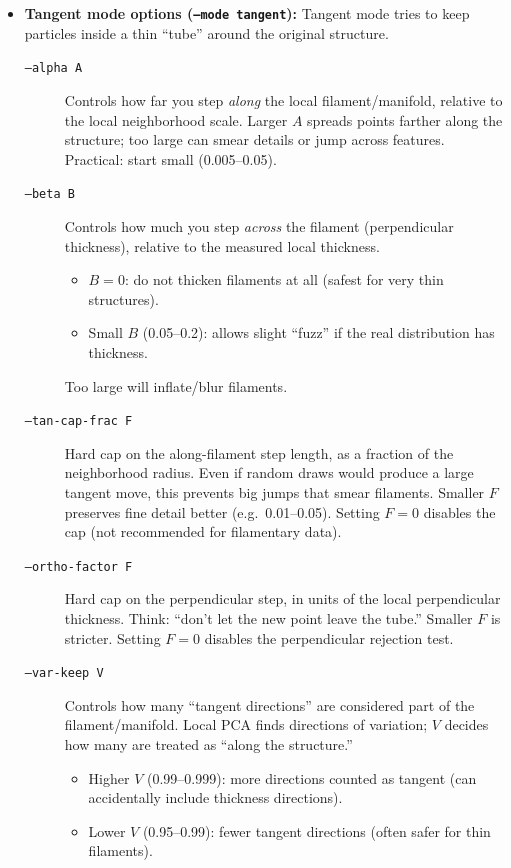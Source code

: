 \documentclass[11pt]{article}
\begin{document}
\begin{itemize}
\item \textbf{Tangent mode options (\texttt{--mode tangent}):}
Tangent mode tries to keep particles inside a thin ``tube'' around the original structure.
\begin{description}
  \item[\texttt{--alpha A}] Controls how far you step \emph{along} the local filament/manifold, relative to the local neighborhood scale. Larger $A$ spreads points farther along the structure; too large can smear details or jump across features. Practical: start small (0.005--0.05).

  \item[\texttt{--beta B}] Controls how much you step \emph{across} the filament (perpendicular thickness), relative to the measured local thickness.
  \begin{itemize}
    \item $B=0$: do not thicken filaments at all (safest for very thin structures).
    \item Small $B$ (0.05--0.2): allows slight ``fuzz'' if the real distribution has thickness.
  \end{itemize}
  Too large will inflate/blur filaments.

  \item[\texttt{--tan-cap-frac F}] Hard cap on the along-filament step length, as a fraction of the neighborhood radius. Even if random draws would produce a large tangent move, this prevents big jumps that smear filaments. Smaller $F$ preserves fine detail better (e.g.\ 0.01--0.05). Setting $F=0$ disables the cap (not recommended for filamentary data).

  \item[\texttt{--ortho-factor F}] Hard cap on the perpendicular step, in units of the local perpendicular thickness. Think: ``don't let the new point leave the tube.'' Smaller $F$ is stricter. Setting $F=0$ disables the perpendicular rejection test.

  \item[\texttt{--var-keep V}] Controls how many ``tangent directions'' are considered part of the filament/manifold. Local PCA finds directions of variation; $V$ decides how many are treated as ``along the structure.''
  \begin{itemize}
    \item Higher $V$ (0.99--0.999): more directions counted as tangent (can accidentally include thickness directions).
    \item Lower $V$ (0.95--0.99): fewer tangent directions (often safer for thin filaments).
  \end{itemize}


\end{description}
\end{itemize}
\end{document}

